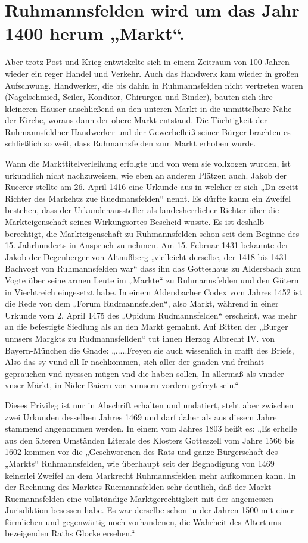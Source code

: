 \documentclass[12pt,a4paper]{book}
\begin{document}
\section{Ruhmannsfelden wird um das Jahr 1400 herum „Markt“.}

Aber trotz Post und Krieg entwickelte sich in einem Zeitraum von 100 Jahren
wieder ein reger Handel und Verkehr. Auch das Handwerk kam wieder in großen
Aufschwung. Handwerker, die bis dahin in Ruhmannsfelden nicht vertreten waren
(Nagelschmied, Seiler, Konditor, Chirurgen und Binder), bauten sich ihre
kleineren Häuser anschließend an den unteren Markt in die unmittelbare Nähe der
Kirche, woraus dann der obere Markt entstand. Die Tüchtigkeit der
Ruhmannsfeldner Handwerker und der Gewerbefleiß seiner Bürger brachten es
schließlich so weit, dass Ruhmannsfelden zum Markt erhoben wurde.

Wann die Markttitelverleihung erfolgte und von wem sie vollzogen wurden, ist
urkundlich nicht nachzuweisen, wie eben an anderen Plätzen auch. Jakob der
Rueerer stellte am 26. April 1416 eine Urkunde aus in welcher er sich „Dn czeitt
Richter des Markehtz zue Ruedmansfelden“ nennt. Es dürfte kaum ein Zweifel
bestehen, dass der Urkundenaussteller als landesherrlicher Richter über die
Markteigenschaft seines Wirkungsortes Bescheid wusste. Es ist deshalb
berechtigt, die Markteigenschaft zu Ruhmannsfelden schon seit dem Beginne des
15. Jahrhunderts in Anspruch zu nehmen. Am 15. Februar 1431 bekannte der Jakob
der Degenberger von Altnußberg „vielleicht derselbe, der 1418 bis 1431 Bachvogt
von Ruhmannsfelden war“ dass ihn das Gotteshaus zu Aldersbach zum Vogte über
seine armen Leute im „Markte“ zu Ruhmannsfelden und den Gütern in Viechtreich
eingesetzt habe. In einem Aldersbacher Codex vom Jahres 1452 ist die Rede von
dem „Forum Rudmannsfelden“, also Markt, während in einer Urkunde vom 2. April
1475 des „Opidum Rudmannsfelden“ erscheint, was mehr an die befestigte Siedlung
als an den Markt gemahnt. Auf Bitten der „Burger unnsers Margkts zu
Rudmannsfellden“ tut ihnen Herzog Albrecht IV. von Bayern-München die Gnade:
„.....Freyen sie auch wissenlich in crafft des Briefs, Also das sy vund all Ir
nachkommen, sich aller der gnaden vnd freihait geprauchen vnd nyessen mügen vnd
die haben sollen, In allermaß als vnnder vnser Märkt, in Nider Baiern von
vnnsern vordern gefreyt sein.“

Dieses Privileg ist nur in Abschrift erhalten und undatiert, steht aber zwischen
zwei Urkunden desselben Jahres 1469 und darf daher als aus diesem Jahre stammend
angenommen werden. In einem vom Jahres 1803 heißt es: „Es erhelle aus den
älteren Umständen Literale des Klosters Gotteszell vom Jahre 1566 bis 1602
kommen vor die „Geschworenen des Rats und ganze Bürgerschaft des „Markts“
Ruhmannsfelden, wie überhaupt seit der Begnadigung von 1469 keinerlei Zweifel an
dem Markrecht Ruhmannsfelden mehr aufkommen kann. In der Rechnung des Marktes
Ruemannsfelden sehr deutlich, daß der Markt Ruemannsfelden eine vollständige
Marktgerechtigkeit mit der angemessen Jurisdiktion besessen habe. Es war
derselbe schon in der Jahren 1500 mit einer förmlichen und gegenwärtig noch
vorhandenen, die Wahrheit des Altertums bezeigenden Raths Glocke ersehen.“
\end{document}
